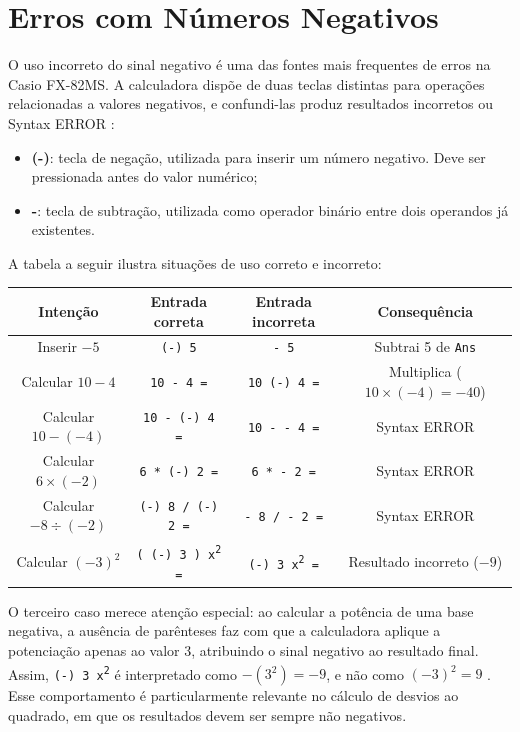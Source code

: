 \section{Erros com Números Negativos}

O uso incorreto do sinal negativo é uma das fontes mais frequentes de erros na Casio FX-82MS. A calculadora dispõe de duas teclas distintas para operações relacionadas a valores negativos, e confundi-las produz resultados incorretos ou Syntax ERROR \cite{casio2004}:

\begin{itemize}
    \item \textbf{(-)}: tecla de negação, utilizada para inserir um número negativo. Deve ser pressionada antes do valor numérico;
    \item \textbf{-}: tecla de subtração, utilizada como operador binário entre dois operandos já existentes.
\end{itemize}

A tabela a seguir ilustra situações de uso correto e incorreto:

\begin{table}[H]
    \centering
    \renewcommand{\arraystretch}{1.3} 
    \begin{tabular}{|c|c|c|c|}
        \hline
        \textbf{Intenção} & \textbf{Entrada correta} & \textbf{Entrada incorreta} & \textbf{Consequência} \\ \hline
        Inserir $-5$ & \texttt{(-) 5} & \texttt{- 5} & Subtrai 5 de \texttt{Ans} \\
        Calcular $10 - 4$ & \texttt{10 - 4 =} & \texttt{10 (-) 4 =} & Multiplica ($10 \times (-4) = -40$) \\
        Calcular $10 - (-4)$ & \texttt{10 - (-) 4 =} & \texttt{10 - - 4 =} & Syntax ERROR \\
        Calcular $6 \times (-2)$ & \texttt{6 * (-) 2 =} & \texttt{6 * - 2 =} & Syntax ERROR \\
        Calcular $-8 \div (-2)$ & \texttt{(-) 8 / (-) 2 =} & \texttt{- 8 / - 2 =} & Syntax ERROR \\
        Calcular $(-3)^2$ & \texttt{( (-) 3 ) x\textsuperscript{2} =} & \texttt{(-) 3 x\textsuperscript{2} =} & Resultado incorreto ($-9$) \\ \hline
    \end{tabular}
\end{table}

O terceiro caso merece atenção especial: ao calcular a potência de uma base negativa, a ausência de parênteses faz com que a calculadora aplique a potenciação apenas ao valor 3, atribuindo o sinal negativo ao resultado final. Assim, \texttt{(-) 3 x\textsuperscript{2}} é interpretado como $-(3^2) = -9$, e não como $(-3)^2 = 9$ \cite{casio2004}. Esse comportamento é particularmente relevante no cálculo de desvios ao quadrado, em que os resultados devem ser sempre não negativos.

